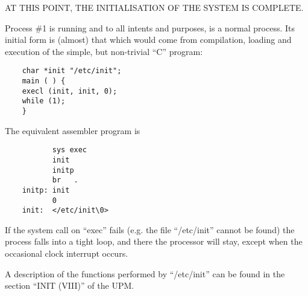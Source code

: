 AT THIS POINT, THE INITIALISATION OF
THE SYSTEM IS COMPLETE.

Process \#1 is running and to all
intents and purposes, is a normal process. Its initial form is (almost)
that which would come from compilation,
loading and execution of the simple,
but non-trivial ``C'' program:

\begin{verbatim}
    char *init "/etc/init";
    main ( ) {
    execl (init, init, 0);
    while (1);
    }
\end{verbatim}

The equivalent assembler program is

\begin{verbatim}
           sys exec
           init
           initp
           br   .
    initp: init
           0
    init:  </etc/init\0>
\end{verbatim}

If the system call on ``exec'' fails
(e.g. the file ``/etc/init'' cannot be
found) the process falls into a tight
loop, and there the processor will
stay, except when the occasional clock
interrupt occurs.


A description of the functions performed by ``/etc/init'' can be found in
the section ``INIT (VIII)'' of the UPM.
